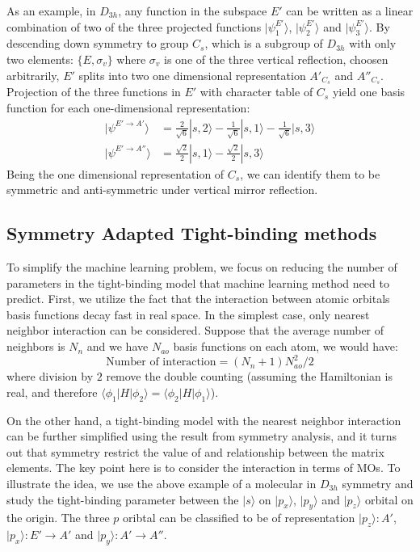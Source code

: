 \documentclass{article}
\begin{document}
As an example, in $D_{3h}$, any function in the subspace $E'$ can be written as a linear combination
of two of the three projected functions $|\psi_1^{E'}\rangle$, $|\psi_2^{E'}\rangle$ and $|\psi_3^{E'}\rangle$. 
By descending down symmetry to group $C_s$, which is a subgroup 
of $D_{3h}$ with only two elements: $\{E, \sigma_v\}$ where $\sigma_v$ is one of the three vertical reflection, 
choosen arbitrarily, $E'$ splits into two one dimensional representation $A'_{C_s}$ and $A''_{C_s}$.
Projection of the three functions in $E'$ with character table of $C_s$ yield 
one basis function for each one-dimensional representation:
\begin{align}
    |\psi^{E'\to A'} \rangle &= \frac{2}{\sqrt{6}} |s,2\rangle - \frac{1}{\sqrt{6}} |s,1\rangle - \frac{1}{\sqrt{6}} |s,3\rangle \\
    |\psi^{E'\to A''}\rangle &= \frac{\sqrt{2}}{2} |s,1\rangle - \frac{\sqrt{2}}{2} |s,3\rangle
\end{align}
Being the one dimensional representation of $C_s$, we can identify them to be 
symmetric and anti-symmetric under vertical mirror reflection. 

\subsection{Symmetry Adapted Tight-binding methods}
To simplify the machine learning problem, we focus on reducing the number of parameters 
in the tight-binding model that machine learning method need to predict. First, we utilize 
the fact that the interaction between atomic orbitals basis functions decay fast 
in real space. In the simplest case, only nearest neighbor interaction can be considered. 
Suppose that the average number of neighbors is $N_n$ and we have $N_{ao}$ basis functions 
on each atom, we would have:
\begin{equation}
    \text{Number of interaction} = ( N_n + 1 ) N_{ao}^2 / 2
\end{equation}
where division by $2$ remove the double counting (assuming the Hamiltonian is real, and 
therefore $\langle \phi_1 | H | \phi_2 \rangle = \langle \phi_2 | H | \phi_1 \rangle$). 

On the other hand, a tight-binding model with the nearest neighbor interaction can be further 
simplified using the result from symmetry analysis, and it turns out that 
symmetry restrict the value of and relationship between the matrix elements. 
The key point here is to consider the interaction in terms of MOs.
To illustrate the idea, we use the above example of a molecular in $D_{3h}$ symmetry and 
study the tight-binding parameter between the $|s\rangle$ on $|p_x\rangle$, $|p_y\rangle$
and $|p_z\rangle$ orbital on the origin. 
The three $p$ oribtal can be classified to be of representation 
$|p_z\rangle: A'$, 
$|p_x\rangle: E'\to A'$ and 
$|p_y\rangle: A'\to A''$. 
\end{document}
